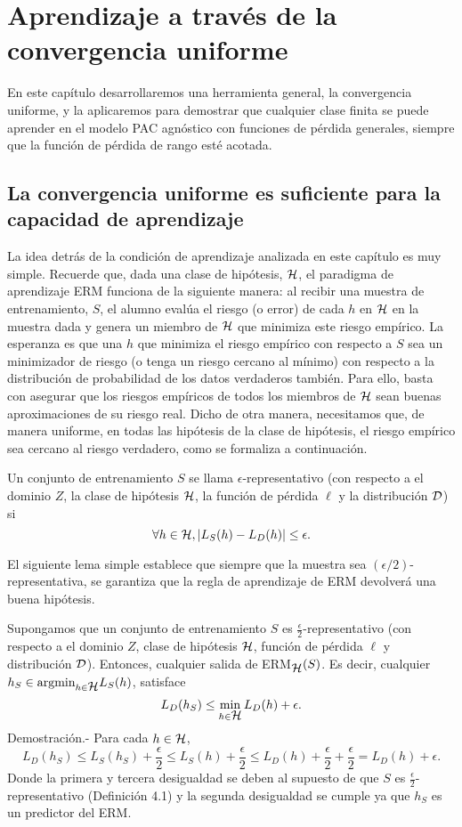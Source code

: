 \chapter{Aprendizaje a través de la convergencia uniforme}
En este capítulo desarrollaremos una herramienta general, la convergencia uniforme, y la aplicaremos para demostrar que cualquier clase finita se puede aprender en el modelo PAC agnóstico con funciones de pérdida generales, siempre que la función de pérdida de rango esté acotada.

\section{La convergencia uniforme es suficiente para la capacidad de aprendizaje}
La idea detrás de la condición de aprendizaje analizada en este capítulo es muy simple. Recuerde que, dada una clase de hipótesis, $\mathop{\mbox{$\mathcal{H}$}}\nolimits$, el paradigma de aprendizaje ERM funciona de la siguiente manera: al recibir una muestra de entrenamiento, $S$, el alumno evalúa el riesgo (o error) de cada $h$ en $\mathop{\mbox{$\mathcal{H}$}}\nolimits$ en la muestra dada y genera un miembro de $\mathop{\mbox{$\mathcal{H}$}}\nolimits$ que minimiza este riesgo empírico. La esperanza es que una $h$ que minimiza el riesgo empírico con respecto a $S$ sea un minimizador de riesgo (o tenga un riesgo cercano al mínimo) con respecto a la distribución de probabilidad de los datos verdaderos también. Para ello, basta con asegurar que los riesgos empíricos de todos los miembros de $\mathop{\mbox{$\mathcal{H}$}}\nolimits$ sean buenas aproximaciones de su riesgo real. Dicho de otra manera, necesitamos que, de manera uniforme, en todas las hipótesis de la clase de hipótesis, el riesgo empírico sea cercano al riesgo verdadero, como se formaliza a continuación.

\begin{def.} Un conjunto de entrenamiento $S$ se llama $\epsilon$-representativo (con respecto a el dominio $Z$, la clase de hipótesis $\mathop{\mbox{$\mathcal{H}$}}\nolimits$, la función de pérdida $\ell$ y la distribución $\mathop{\mbox{$\mathcal{D}$}}\nolimits$) si
    $$\forall h \in \mathop{\mbox{$\mathcal{H}$}}\nolimits, |L_S(h) - L_D(h)| \leq \epsilon.$$
\end{def.}

El siguiente lema simple establece que siempre que la muestra sea $(\epsilon/2)$-representativa, se garantiza que la regla de aprendizaje de ERM devolverá una buena hipótesis.

\begin{lema}
    Supongamos que un conjunto de entrenamiento $S$ es $\frac{\epsilon}{2}$-representativo (con respecto a el dominio $Z$, clase de hipótesis $\mathop{\mbox{$\mathcal{H}$}}\nolimits$, función de pérdida $\ell$ y distribución $\mathop{\mbox{$\mathcal{D}$}}\nolimits$). Entonces, cualquier salida de ERM$_{\mathop{\mbox{$\mathcal{H}$}}\nolimits}(S)$. Es decir, cualquier $h_S \in \text{argmin}_{h\in \mathop{\mbox{$\mathcal{H}$}}\nolimits} L_S(h)$, satisface
    $$L_D(h_S) \leq \min_{h \in \mathop{\mbox{$\mathcal{H}$}}\nolimits} L_D(h) + \epsilon.$$
    Demostración.-\; Para cada $h \in \mathop{\mbox{$\mathcal{H}$}}\nolimits$, 
    $$L_D(h_S) \leq L_S(h_S) + \frac{\epsilon}{2} \leq L_S(h)+\frac{\epsilon}{2} \leq L_D(h) + \frac{\epsilon}{2} + \frac{\epsilon}{2} = L_D(h) + \epsilon.$$
    Donde la primera y tercera desigualdad se deben al supuesto de que $S$ es $\frac{\epsilon}{2}$-representativo (Definición 4.1) y la segunda desigualdad se cumple ya que $h_S$ es un predictor del ERM.
\end{lema}

